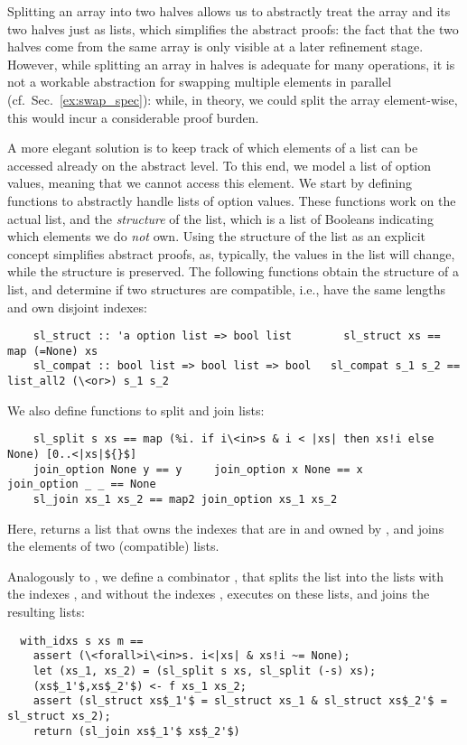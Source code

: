 \documentclass[sn-mathphys,Numbered]{sn-jnl}
\theoremstyle{thmstyleone}%
\theoremstyle{definition}%
\theoremstyle{thmstylethree}%
\begin{document}
  Splitting an array into two halves allows us to abstractly treat the array and its two halves just as lists,
  which simplifies the abstract proofs: the fact that the two halves come from the same array is only visible
  at a later refinement stage. However, while splitting an array in halves is adequate for many operations,
  it is not a workable abstraction for swapping multiple elements in parallel (cf.~Sec.~\ref{ex:swap_spec}):
  while, in theory, we could split the array element-wise, this would incur a considerable proof burden.

  A more elegant solution is to keep track of which elements of a list can be accessed already on the abstract level. To this end,
  we model a list of option values,  meaning that we cannot access this element.
  We start by defining functions to abstractly handle lists of option values.
  These functions work on the actual list, and the \emph{structure} of the list,
  which is a list of Booleans indicating which elements we do \emph{not} own.
  Using the structure of the list as an explicit concept simplifies abstract proofs, as, typically,
  the values in the list will change, while the structure is preserved.
  The following functions obtain the structure of a list, and determine if two
  structures are compatible, i.e., have the same lengths and own disjoint indexes:
  \begin{lstlisting}
    sl_struct :: 'a option list => bool list        sl_struct xs == map (=None) xs
    sl_compat :: bool list => bool list => bool   sl_compat s_1 s_2 == list_all2 (\<or>) s_1 s_2
  \end{lstlisting}
  We also define functions to split and join lists:
  \begin{lstlisting}
    sl_split s xs == map (%i. if i\<in>s & i < |xs| then xs!i else None) [0..<|xs|${}$]
    join_option None y == y     join_option x None == x      join_option _ _ == None
    sl_join xs_1 xs_2 == map2 join_option xs_1 xs_2
  \end{lstlisting}
  Here,  returns a list that owns the indexes that are in  and owned by ,
  and  joins the elements of two (compatible) lists.

  Analogously to , we define a combinator , that splits
  the list  into the lists with the indexes , and without the indexes , executes  on these lists,
  and joins the resulting lists:
  \begin{lstlisting}
  with_idxs s xs m ==
    assert (\<forall>i\<in>s. i<|xs| & xs!i ~= None);
    let (xs_1, xs_2) = (sl_split s xs, sl_split (-s) xs);
    (xs$_1'$,xs$_2'$) <- f xs_1 xs_2;
    assert (sl_struct xs$_1'$ = sl_struct xs_1 & sl_struct xs$_2'$ = sl_struct xs_2);
    return (sl_join xs$_1'$ xs$_2'$)
  \end{lstlisting}
\end{document}
